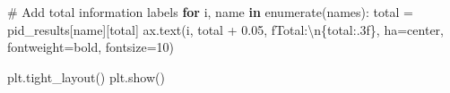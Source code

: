 \documentclass[
  11pt,
  letterpaper,
  oneside,
  openany]{book}
\newenvironment{Shaded}{\begin{snugshade}}{\end{snugshade}}
\newcommand{\BuiltInTok}[1]{\textcolor[rgb]{0.00,0.23,0.31}{#1}}
\newcommand{\CharTok}[1]{\textcolor[rgb]{0.13,0.47,0.30}{#1}}
\newcommand{\CommentTok}[1]{\textcolor[rgb]{0.37,0.37,0.37}{#1}}
\newcommand{\ControlFlowTok}[1]{\textcolor[rgb]{0.00,0.23,0.31}{\textbf{#1}}}
\newcommand{\DecValTok}[1]{\textcolor[rgb]{0.68,0.00,0.00}{#1}}
\newcommand{\FloatTok}[1]{\textcolor[rgb]{0.68,0.00,0.00}{#1}}
\newcommand{\KeywordTok}[1]{\textcolor[rgb]{0.00,0.23,0.31}{\textbf{#1}}}
\newcommand{\NormalTok}[1]{\textcolor[rgb]{0.00,0.23,0.31}{#1}}
\newcommand{\OperatorTok}[1]{\textcolor[rgb]{0.37,0.37,0.37}{#1}}
\newcommand{\SpecialCharTok}[1]{\textcolor[rgb]{0.37,0.37,0.37}{#1}}
\newcommand{\SpecialStringTok}[1]{\textcolor[rgb]{0.13,0.47,0.30}{#1}}
\newcommand{\StringTok}[1]{\textcolor[rgb]{0.13,0.47,0.30}{#1}}
\begin{document}
\begin{Shaded}
\begin{Highlighting}[]
    \CommentTok{\# Add total information labels}
    \ControlFlowTok{for}\NormalTok{ i, name }\KeywordTok{in} \BuiltInTok{enumerate}\NormalTok{(names):}
\NormalTok{        total }\OperatorTok{=}\NormalTok{ pid\_results[name][}\StringTok{\textquotesingle{}total\textquotesingle{}}\NormalTok{]}
\NormalTok{        ax.text(i, total }\OperatorTok{+} \FloatTok{0.05}\NormalTok{, }\SpecialStringTok{f\textquotesingle{}Total:}\CharTok{\textbackslash{}n}\SpecialCharTok{\{}\NormalTok{total}\SpecialCharTok{:.3f\}}\SpecialStringTok{\textquotesingle{}}\NormalTok{, }
\NormalTok{                ha}\OperatorTok{=}\StringTok{\textquotesingle{}center\textquotesingle{}}\NormalTok{, fontweight}\OperatorTok{=}\StringTok{\textquotesingle{}bold\textquotesingle{}}\NormalTok{, fontsize}\OperatorTok{=}\DecValTok{10}\NormalTok{)}

\NormalTok{    plt.tight\_layout()}
\NormalTok{    plt.show()}


\end{Highlighting}
\end{Shaded}
\end{document}
